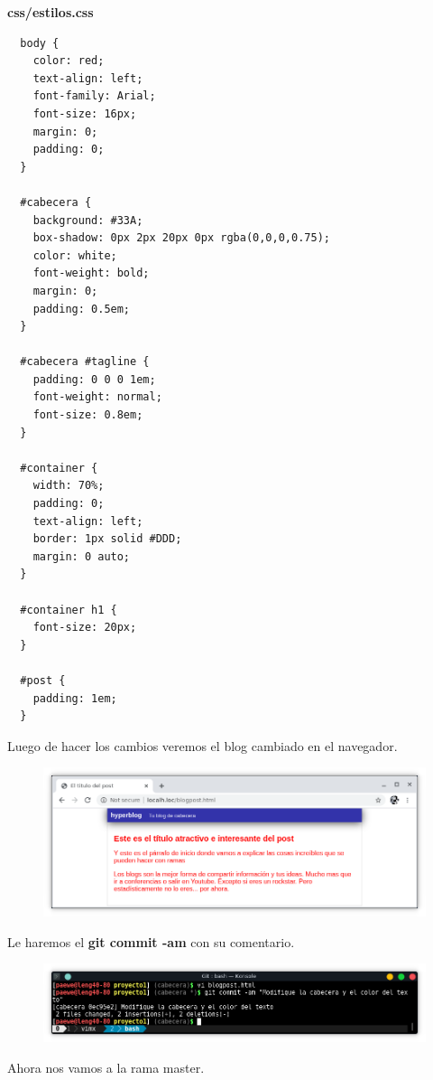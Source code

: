 \documentclass{article}
\begin{document}
\textbf{css/estilos.css}
\begin{verbatim}
  body {
    color: red;
    text-align: left;
    font-family: Arial;
    font-size: 16px;
    margin: 0;
    padding: 0;
  }

  #cabecera {
    background: #33A;
    box-shadow: 0px 2px 20px 0px rgba(0,0,0,0.75);
    color: white;
    font-weight: bold;
    margin: 0;
    padding: 0.5em;
  }

  #cabecera #tagline {
    padding: 0 0 0 1em;
    font-weight: normal;
    font-size: 0.8em;
  }

  #container {
    width: 70%;
    padding: 0;
    text-align: left;
    border: 1px solid #DDD;
    margin: 0 auto;
  }

  #container h1 {
    font-size: 20px;
  }

  #post {
    padding: 1em;
  }
\end{verbatim}

Luego de hacer los cambios veremos el blog cambiado en el navegador.

\begin{figure}[h!]
  \centering
  \includegraphics[scale=0.75]{./Pictures/172_cabecera_changed.png}
\end{figure}

\newpage

Le haremos el \textbf{git commit -am} con su comentario.

\begin{figure}[h!]
  \centering
  \includegraphics[scale=0.75]{./Pictures/173_commit_cabecera.png}
\end{figure}

Ahora nos vamos a la rama master.
\end{document}
